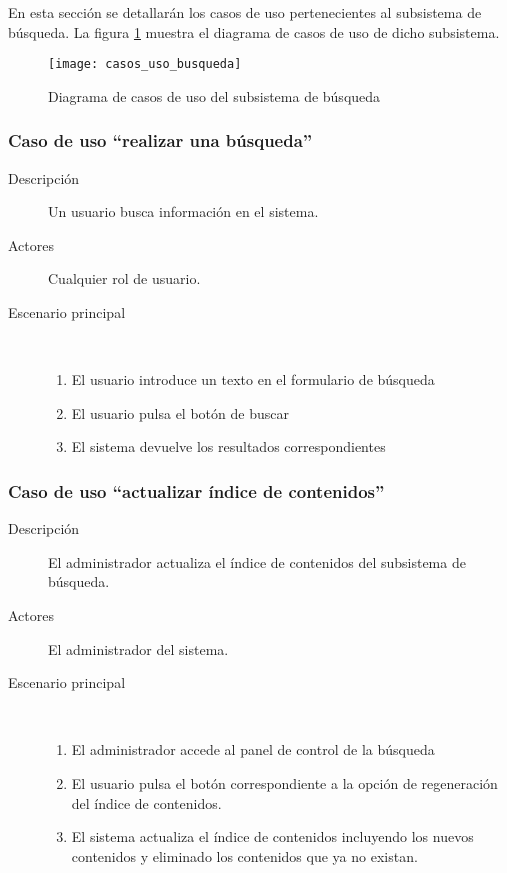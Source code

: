 En esta sección se detallarán los casos de uso pertenecientes al subsistema de búsqueda. La figura \ref{fig:casos_uso_subsistema_busqueda} muestra el diagrama de casos de uso de dicho subsistema.

\begin{figure}[h]
\centering
\texttt{[image: casos\_uso\_busqueda]}
\caption{Diagrama de casos de uso del subsistema de búsqueda}
\label{fig:casos_uso_subsistema_busqueda}
\end{figure}

\subsubsection{Caso de uso ``realizar una búsqueda''}
\begin{description}
\item[Descripción] Un usuario busca información en el sistema.
\item[Actores] Cualquier rol de usuario.
\item[Escenario principal] \hfill \\	\begin{enumerate}
							\item El usuario introduce un texto en el formulario de búsqueda
							\item El usuario pulsa el botón de buscar
							\item El sistema devuelve los resultados correspondientes
							\end{enumerate}						
\end{description}

\subsubsection{Caso de uso ``actualizar índice de contenidos''}
\begin{description}
\item[Descripción] El administrador actualiza el índice de contenidos del subsistema de búsqueda.
\item[Actores] El administrador del sistema.
\item[Escenario principal] \hfill \\ 	\begin{enumerate}
							\item El administrador accede al panel de control de la búsqueda
							\item El usuario pulsa el botón correspondiente a la opción de regeneración del índice de contenidos.
							\item El sistema actualiza el índice de contenidos incluyendo los nuevos contenidos y eliminado los contenidos que ya no existan.
							\end{enumerate}						
\end{description}